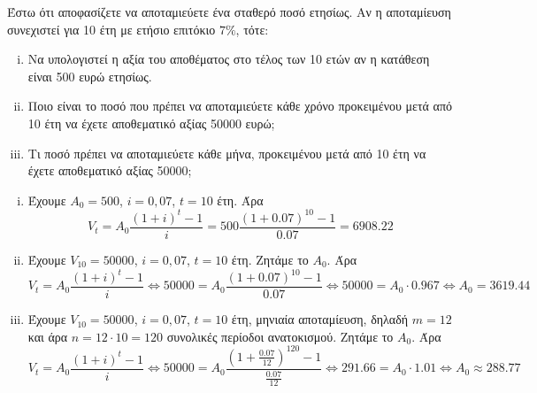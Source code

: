 \documentclass[a4paper,table]{report}
\begin{document}
\begin{example}
Έστω ότι αποφασίζετε να αποταμιεύετε ένα σταθερό ποσό ετησίως. Αν η αποταμίευση 
συνεχιστεί για 10 έτη με ετήσιο επιτόκιο $ 7\% $, τότε:
\begin{enumerate}[i)]
  \item Να υπολογιστεί η αξία του αποθέματος στο τέλος των 10 ετών αν η κατάθεση είναι 
    500 ευρώ ετησίως.
  \item Ποιο είναι το ποσό που πρέπει να αποταμιεύετε κάθε χρόνο προκειμένου μετά από 
    10 έτη να έχετε αποθεματικό αξίας 50000 ευρώ; 
  \item Τι ποσό πρέπει να αποταμιεύετε κάθε μήνα, προκειμένου μετά από 10 έτη να έχετε
    αποθεματικό αξίας 50000; 
\end{enumerate}
\begin{solution}
\item {}
  \begin{enumerate}[i)]
    \item Έχουμε $ A_{0} = 500 $, $ i=0,07 $, $ t=10 $ έτη. Άρα
      \[
        V_{t} = A_{0} \frac{(1+i)^{t}-1}{i} = 500 \frac{(1+0.07)^{10}-1}{0.07} = 
        6908.22
      \] 
    \item Έχουμε $ V_{10} = 50000 $, $ i=0,07 $, $ t=10 $ έτη. Ζητάμε το $ A_{0} $. Άρα
      \[
        V_{t} = A_{0} \frac{(1+i)^{t}-1}{i} \Leftrightarrow 50000 = A_{0}
        \frac{(1+0.07)^{10}-1}{0.07} \Leftrightarrow 50000 = A_{0} \cdot 0.967 
        \Leftrightarrow A_{0} = 3619.44
      \] 
    \item Έχουμε $ V_{10} = 50000 $, $ i=0,07 $, $ t=10 $ έτη, μηνιαία αποταμίευση,
      δηλαδή $ m=12 $ και άρα $n = 12\cdot 10 = 120$ συνολικές περίοδοι ανατοκισμού. 
      Ζητάμε το $ A_{0} $. Άρα
      \[
        V_{t} = A_{0} \frac{(1+i)^{t}-1}{i} \Leftrightarrow 50000 = A_{0}
        \frac{(1+ \frac{0.07}{12})^{120}-1}{\frac{0.07}{12}} \Leftrightarrow 291.66 =
        A_{0} \cdot 1.01 \Leftrightarrow A_{0} \approx 288.77
       \] 
  \end{enumerate}
\end{solution}
\end{example}
\end{document}
